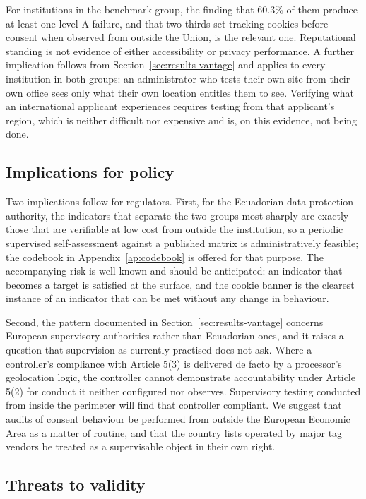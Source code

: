 \documentclass[pdflatex,sn-basic,Numbered]{sn-jnl}
\theoremstyle{thmstyleone}
\theoremstyle{thmstyletwo}
\theoremstyle{thmstylethree}
\begin{document}
For institutions in the benchmark group, the finding that 60.3\% of them produce at least one level-A failure, and that two thirds set tracking cookies before consent when observed from outside the Union, is the relevant one. Reputational standing is not evidence of either accessibility or privacy performance. A further implication follows from Section~\ref{sec:results-vantage} and applies to every institution in both groups: an administrator who tests their own site from their own office sees only what their own location entitles them to see. Verifying what an international applicant experiences requires testing from that applicant's region, which is neither difficult nor expensive and is, on this evidence, not being done.

\subsection{Implications for policy}\label{sec:discussion-policy}

Two implications follow for regulators. First, for the Ecuadorian data protection authority, the indicators that separate the two groups most sharply are exactly those that are verifiable at low cost from outside the institution, so a periodic supervised self-assessment against a published matrix is administratively feasible; the codebook in Appendix~\ref{ap:codebook} is offered for that purpose. The accompanying risk is well known and should be anticipated: an indicator that becomes a target is satisfied at the surface, and the cookie banner is the clearest instance of an indicator that can be met without any change in behaviour.

Second, the pattern documented in Section~\ref{sec:results-vantage} concerns European supervisory authorities rather than Ecuadorian ones, and it raises a question that supervision as currently practised does not ask. Where a controller's compliance with Article 5(3) is delivered de facto by a processor's geolocation logic, the controller cannot demonstrate accountability under Article 5(2) for conduct it neither configured nor observes. Supervisory testing conducted from inside the perimeter will find that controller compliant. We suggest that audits of consent behaviour be performed from outside the European Economic Area as a matter of routine, and that the country lists operated by major tag vendors be treated as a supervisable object in their own right.

\subsection{Threats to validity}\label{sec:threats}
\end{document}

